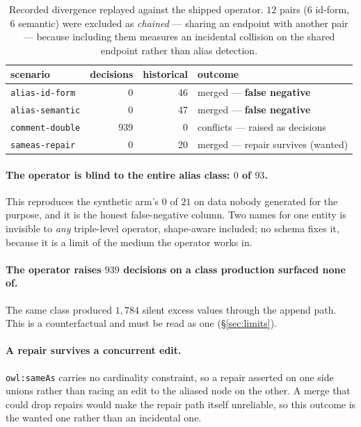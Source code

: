 \begin{table}[t]
\centering\small
\begin{tabular}{lrrl}
\toprule
scenario & decisions & historical & outcome \\
\midrule
\texttt{alias-id-form}   & 0   & 46 & merged --- \textbf{false negative} \\
\texttt{alias-semantic}  & 0   & 47 & merged --- \textbf{false negative} \\
\texttt{comment-double}  & 939 & 0  & conflicts --- raised as decisions \\
\texttt{sameas-repair}   & 0   & 20 & merged --- repair survives (wanted) \\
\bottomrule
\end{tabular}
\caption{Recorded divergence replayed against the shipped operator. $12$ pairs
($6$ id-form, $6$ semantic) were excluded as \emph{chained} --- sharing an
endpoint with another pair --- because including them measures an incidental
collision on the shared endpoint rather than alias detection.}
\label{tab:armB}
\end{table}

\paragraph{The operator is blind to the entire alias class: $0$ of $93$.} This
reproduces the synthetic arm's $0$ of $21$ on data nobody generated for the
purpose, and it is the honest false-negative column. Two names for one entity is
invisible to \emph{any} triple-level operator, shape-aware included; no schema
fixes it, because it is a limit of the medium the operator works in.

\paragraph{The operator raises $939$ decisions on a class production surfaced
none of.} The same class produced $1{,}784$ silent excess values through the
append path. This is a counterfactual and must be read as one
(\S\ref{sec:limits}).

\paragraph{A repair survives a concurrent edit.} \texttt{owl:sameAs} carries no
cardinality constraint, so a repair asserted on one side unions rather than
racing an edit to the aliased node on the other. A merge that could drop repairs
would make the repair path itself unreliable, so this outcome is the wanted one
rather than an incidental one.

